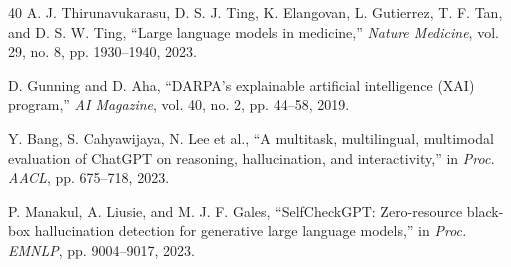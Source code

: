 \documentclass{article}
\begin{document}
\begin{thebibliography}{40}
A. J. Thirunavukarasu, D. S. J. Ting, K. Elangovan, L. Gutierrez, T. F. Tan, and D. S. W. Ting,
``Large language models in medicine,''
\textit{Nature Medicine}, vol. 29, no. 8, pp. 1930--1940, 2023.

D. Gunning and D. Aha,
``DARPA's explainable artificial intelligence (XAI) program,''
\textit{AI Magazine}, vol. 40, no. 2, pp. 44--58, 2019.

Y. Bang, S. Cahyawijaya, N. Lee et al.,
``A multitask, multilingual, multimodal evaluation of ChatGPT on reasoning, hallucination, and interactivity,''
in \textit{Proc. AACL}, pp. 675--718, 2023.

P. Manakul, A. Liusie, and M. J. F. Gales,
``SelfCheckGPT: Zero-resource black-box hallucination detection for generative large language models,''
in \textit{Proc. EMNLP}, pp. 9004--9017, 2023.

\end{thebibliography}
\end{document}
